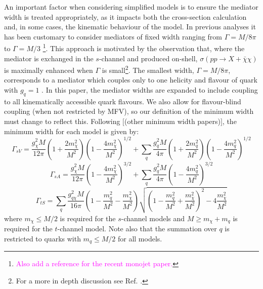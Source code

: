 An important factor when considering simplified models is to ensure the mediator width is treated appropriately, as it impacts both the cross-section calculation and, in some cases, the kinematic behaviour of the model. In previous analyses it has been customary to consider mediators of fixed width ranging from $\Gamma = M/8\pi$ to $\Gamma = M/3$ \cite{METSig, Fox:2012ee} \footnote{\textcolor{magenta}{Also add a reference for the recent monojet paper.}}. This approach is motivated by the observation that, where the mediator is exchanged in the $s$-channel and produced on-shell, $\sigma\left(pp \rightarrow X + \bar{\chi}\chi\right)$ is maximally enhanced when $\Gamma$ is small\footnote{For a more in depth discussion see Ref. \cite{METSig}.}. The smallest width, $\Gamma = M/8\pi$, corresponds to a mediator which couples only to one helicity and flavour of quark with $g_{q} = 1$ \cite{METSig}. In this paper, the mediator widths are expanded to include coupling to all kinematically accessible quark flavours. We also allow for flavour-blind coupling (when not restricted by MFV), so our definition of the minimum width must change to reflect this. Following $[$(other minimum width papers)$]$, the minimum width for each model is given by:
\begin{equation}
\label{gamma_sV}
\Gamma_{sV} = \frac{g_{\chi}^2 M}{12\pi}\left(1 + \frac{2m_{\chi}^{2}}{M^{2}}\right)\left(1 - \frac{4m_{\chi}^{2}}{M^{2}}\right)^{1/2} + \sum_{\substack{q}}\frac{g_q^2M}{4\pi}\left(1 + \frac{2m_{q}^{2}}{M^{2}}\right)\left(1 - \frac{4m_{q}^{2}}{M^{2}}\right)^{1/2}
\end{equation}
\begin{equation}
\label{gamma_sA}
\Gamma_{sA} = \frac{g_{\chi}^2 M}{12\pi}\left(1 - \frac{4m_{\chi}^{2}}{M^{2}}\right)^{3/2} + \sum_{\substack{q}}\frac{g_q^2 M}{4\pi}\left(1 - \frac{4m_{q}^{2}}{M^{2}}\right)^{3/2}
\end{equation}
\begin{equation}
\label{gamma_tS}
\Gamma_{tS} = \sum_{\substack{q}} \frac{g_{q\chi}^2M}{16\pi}\left(1 - \frac{m_{q}^{2}}{M^{2}} - \frac{m_{\chi}^{2}}{M^{2}}\right)\sqrt{\left(1 - \frac{m_{q}^{2}}{M^{2}} + \frac{m_{\chi}^{2}}{M^{2}}\right)^{2} - 4\frac{m_{\chi}^{2}}{M^{2}}}
\end{equation}
where $m_{\chi} \leq M/2$ is required for the $s$-channel models and $M \geq m_{\chi} + m_{q}$ is required for the $t$-channel model. Note also that the summation over $q$ is restricted to quarks with $m_{q} \leq M/2$ for all models. 

